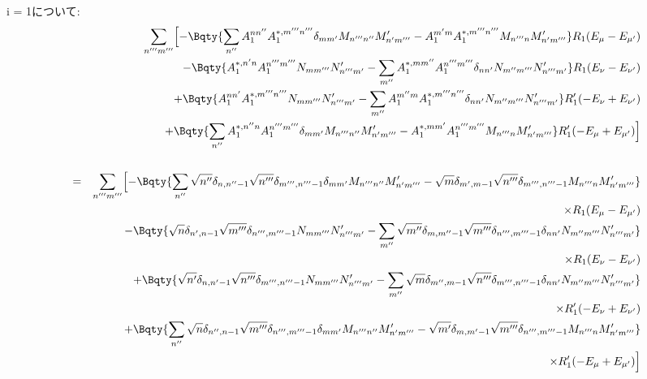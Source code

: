 \documentclass[10.5pt,a4paper]{jreport}
\begin{document}
i = 1について:
\begin{eqnarray}
  &&\sum_{n'''m'''}\Bigl[\nonumber -\Bqty{\sum_{n''}A_1^{nn''}A_1^{*, m'''n'''}\delta_{mm'}M_{n'''n''}M_{n'm'''}' - A_1^{m'm}A_1^{*, m'''n'''}M_{n'''n}M_{n'm'''}'}R_1(E_\mu - E_{\mu'})\\
    \nonumber &&- \Bqty{A_1^{*, n'n}A_1^{n'''m'''}N_{mm'''}N_{n'''m'}' - \sum_{m''}A_1^{*, mm''}A_1^{n'''m'''}\delta_{nn'}N_{m''m'''}N_{n'''m'}'}R_1(E_\nu - E_{\nu'})\\
    \nonumber &&+ \Bqty{A_1^{nn'}A_1^{*, m'''n'''}N_{mm'''}N_{n'''m'}' - \sum_{m''}A_1^{m''m}A_1^{*, m'''n'''}\delta_{nn'}N_{m''m'''}N_{n'''m'}'}R_1'(-E_\nu + E_{\nu'})\\
    \nonumber&&+\Bqty{\sum_{n''}A_1^{*, n''n}A_1^{n'''m'''}\delta_{mm'}M_{n'''n''}M_{n'm'''}' - A_1^{*, mm'}A_1^{n'''m'''}M_{n'''n}M_{n'm'''}'}R_1'(- E_\mu + E_{\mu'})\Bigr]\\
  \\
  &=&\sum_{n'''m'''}\Bigl[\nonumber -\Bqty{\sum_{n''}\sqrt{n''}\delta_{n, n''-1}\sqrt{n'''}\delta_{m''', n'''-1}\delta_{mm'}M_{n'''n''}M_{n'm'''}' - \sqrt{m}\delta_{m', m-1}\sqrt{n'''}\delta_{m''', n'''-1}M_{n'''n}M_{n'm'''}'}\\
    \nonumber&&\hspace{14cm}\times R_1(E_\mu - E_{\mu'})\\
    \nonumber &&- \Bqty{\sqrt{n}\delta_{n', n-1}\sqrt{m'''}\delta_{n''', m'''-1}N_{mm'''}N_{n'''m'}' - \sum_{m''}\sqrt{m''}\delta_{m, m''-1}\sqrt{m'''}\delta_{n''', m'''-1}\delta_{nn'}N_{m''m'''}N_{n'''m'}'}\\
    \nonumber&&\hspace{14cm}\times R_1(E_\nu - E_{\nu'})\\
    \nonumber &&+ \Bqty{\sqrt{n'}\delta_{n, n'-1}\sqrt{n'''}\delta_{m''', n'''-1}N_{mm'''}N_{n'''m'}' - \sum_{m''}\sqrt{m}\delta_{m'', m-1}\sqrt{n'''}\delta_{m''', n'''-1}\delta_{nn'}N_{m''m'''}N_{n'''m'}'}\\
    \nonumber&&\hspace{14cm}\times R_1'(-E_\nu + E_{\nu'})\\
    \nonumber&&+\Bqty{\sum_{n''}\sqrt{n}\delta_{n'', n-1}\sqrt{m'''}\delta_{n''', m'''-1}\delta_{mm'}M_{n'''n''}M_{n'm'''}' - \sqrt{m'}\delta_{m, m'-1}\sqrt{m'''}\delta_{n''', m'''-1}M_{n'''n}M_{n'm'''}'}\\
    \nonumber&&\hspace{14cm}\times R_1'(- E_\mu + E_{\mu'})\Bigr]\\
  \\

\end{eqnarray}
\end{document}
